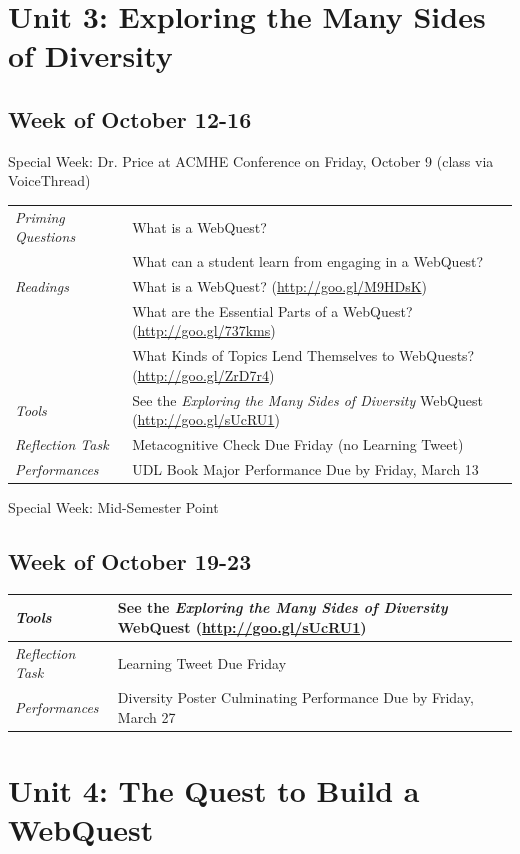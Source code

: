 \documentclass{tufte-handout}
\newcommand{\tabpq}{\faQuestionCircle\medspace\textit{Priming Questions}}
\newcommand{\tabread}{\faBook\medspace\textit{Readings}}
\newcommand{\tabperformance}{\faTasks\medspace\textit{Performances}}
\newcommand{\tabtools}{\faWrench\medspace\textit{Tools}}
\newcommand{\tabtweet}{\faLightbulbO\medspace\textit{Reflection Task} & Learning Tweet Due Friday \\}
\newcommand{\tabcheck}{\faLightbulbO\medspace\textit{Reflection Task} & Metacognitive Check Due Friday (no Learning Tweet) \\}
\newenvironment{tabsched}
	{\small
	\begin{tabular}{p{1.5in}p{4.5in}}
	\toprule}
	{\bottomrule
	\end{tabular}
	\normalsize}
\newenvironment{specweek}
	{\begin{center}
		\fontseries{b} \faBullhorn \medspace Special Week: }
		{\medspace \faBullhorn \fontseries{m}
	\end{center}}
\newcommand{\weeknine}{October 12-16}
\newcommand{\weekten}{October 19-23}
\newcommand{\midsemester}{Mid-Semester Point}
\newcommand{\acmhe}{Dr. Price at ACMHE Conference on Friday, October 9 (class via VoiceThread)}
\begin{document}
\section{Unit 3: Exploring the Many Sides of Diversity}

\subsection{Week of \weeknine}

\begin{specweek}\acmhe\end{specweek}

\begin{tabsched}
	\tabpq & What is a WebQuest? \\
	& What can a student learn from engaging in a WebQuest? \\
	\midrule
	\tabread &  What is a WebQuest? (\url{http://goo.gl/M9HDsK}) \\
	& What are the Essential Parts of a WebQuest? (\url{http://goo.gl/737kms}) \\
	& What Kinds of Topics Lend Themselves to WebQuests? (\url{http://goo.gl/ZrD7r4}) \\
	\midrule
	\tabtools & See the \textit{Exploring the Many Sides of Diversity} WebQuest (\url{http://goo.gl/sUcRU1}) \\
	\midrule
	\tabcheck
	\midrule
	\tabperformance & UDL Book Major Performance Due by Friday, March 13 \\
\end{tabsched}

\begin{specweek}\midsemester\end{specweek}

\subsection{Week of \weekten}

\begin{tabsched}
	\tabtools & See the \textit{Exploring the Many Sides of Diversity} WebQuest (\url{http://goo.gl/sUcRU1}) \\
	\midrule
	\tabtweet
	\midrule
	\tabperformance & Diversity Poster Culminating Performance Due by Friday, March 27 \\
\end{tabsched}

\section{Unit 4: The Quest to Build a WebQuest}
\end{document}
